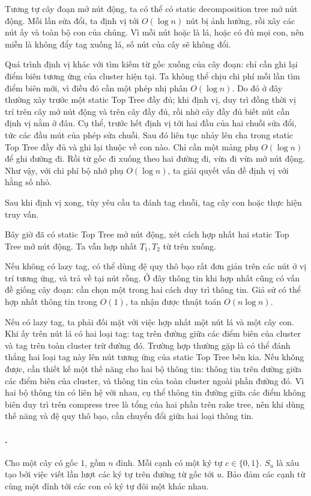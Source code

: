 \documentclass[11pt]{article}
\begin{document}
Tương tự cây đoạn mở nút động, ta có thể có static decomposition tree mở nút
động. Mỗi lần sửa đổi, ta định vị tới \(O(\log n)\) nút bị ảnh hưởng, rồi xây
các nút ấy và toàn bộ con của chúng. Vì mỗi nút hoặc là lá, hoặc có đủ mọi con,
nên miễn là không đẩy tag xuống lá, số nút của cây sẽ không đổi.

Quá trình định vị khác với tìm kiếm từ gốc xuống của cây đoạn: chỉ cần ghi lại
điểm biên tương ứng của cluster hiện tại. Ta không thể chịu chi phí mỗi lần tìm
điểm biên mới, vì điều đó cần một phép nhị phân \(O(\log n)\). Do đó ở đây
thường xây trước một static Top Tree đầy đủ; khi định vị, duy trì đồng thời vị
trí trên cây mở nút động và trên cây đầy đủ, rồi nhờ cây đầy đủ biết nút cần
định vị nằm ở đâu. Cụ thể, trước hết định vị tới hai đầu của hai chuỗi sửa đổi,
tức các đầu mút của phép sửa chuỗi. Sau đó liên tục nhảy lên cha trong static
Top Tree đầy đủ và ghi lại thuộc về con nào. Chỉ cần một mảng phụ \(O(\log n)\)
để ghi đường đi. Rồi từ gốc đi xuống theo hai đường đi, vừa đi vừa mở nút động.
Như vậy, với chi phí bộ nhớ phụ \(O(\log n)\), ta giải quyết vấn đề định vị với
hằng số nhỏ.

Sau khi định vị xong, tùy yêu cầu ta đánh tag chuỗi, tag cây con hoặc thực hiện
truy vấn.

Bây giờ đã có static Top Tree mở nút động, xét cách hợp nhất hai static Top
Tree mở nút động. Ta vẫn hợp nhất \(T_1,T_2\) từ trên xuống.

Nếu không có lazy tag, có thể dùng đệ quy thô bạo rất đơn giản trên các nút ở
vị trí tương ứng, và trả về tại nút rỗng. Ở đây thông tin khi hợp nhất cũng có
vấn đề giống cây đoạn: cần chọn một trong hai cách duy trì thông tin. Giả sử có
thể hợp nhất thông tin trong \(O(1)\), ta nhận được thuật toán
\(O(n\log n)\).

Nếu có lazy tag, ta phải đối mặt với việc hợp nhất một nút lá và một cây con.
Khi ấy trên nút lá có hai loại tag: tag trên đường giữa các điểm biên của
cluster và tag trên toàn cluster trừ đường đó. Trường hợp thường gặp là có thể
đánh thẳng hai loại tag này lên nút tương ứng của static Top Tree bên kia. Nếu
không được, cần thiết kế một thế năng cho hai bộ thông tin: thông tin trên
đường giữa các điểm biên của cluster, và thông tin của toàn cluster ngoài phần
đường đó. Vì hai bộ thông tin có liên hệ với nhau, cụ thể thông tin đường giữa
các điểm không biên duy trì trên compress tree là tổng của hai phần trên rake
tree, nên khi dùng thế năng và đệ quy thô bạo, cần chuyển đổi giữa hai loại
thông tin.

\paragraph{.}
Cho một cây có gốc \(1\), gồm \(n\) đỉnh. Mỗi cạnh có một ký tự
\(c\in\{0,1\}\). \(S_u\) là xâu tạo bởi việc viết lần lượt các ký tự trên đường
từ gốc tới \(u\). Bảo đảm các cạnh từ cùng một đỉnh tới các con có ký tự đôi
một khác nhau.
\end{document}
